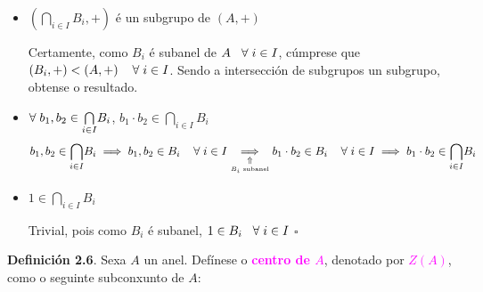 \documentclass[twoside]{report}
\newcommand{\magbf}[1]{\textcolor{magenta}{\textbf{#1}}} %
\newcommand{\magen}[1]{\textcolor{magenta}{#1}}
\theoremstyle{mystyle}
\begin{document}
\begin{itemize}
    
    \item $(\underset{i \in I}{\bigcap}B_{i}, +)$ é un subgrupo de $(A, +)$
    
    Certamente, como $B_{i}$ é subanel de $A \hspace{3mm} \forall \hspace{1mm} i \in I$, cúmprese que $(B_{i},+) < (A,+) \hspace{4mm} \forall \hspace{1mm} i \in I$. Sendo a intersección de subgrupos un subgrupo, obtense o resultado.
    
    \item $\forall \hspace{1mm} b_{1},b_{2} \in \underset{i \in I}{\bigcap}B_{i}$, $b_{1} \cdot b_{2} \in \underset{i \in I}{\bigcap}B_{i}$
    $$b_{1},b_{2} \in \underset{i \in I}{\bigcap}B_{i} \implies b_{1}, b_{2} \in B_{i} \hspace{4mm} \forall \hspace{1mm} i \in I \underset{\underset{B_{i} \text{ subanel}}{\Uparrow}}{\implies} b_{1} \cdot b_{2} \in B_{i} \hspace{4mm} \forall \hspace{1mm} i \in I \implies b_{1} \cdot b_{2} \in \underset{i \in I}{\bigcap}B_{i}$$
    
    \item $1 \in \underset{i \in I}{\bigcap}B_{i}$
    
    Trivial, pois como $B_{i}$ é subanel, $1 \in B_{i} \hspace{3mm} \forall \hspace{1mm} i \in I$ \hspace{3mm} $\square$
    
\end{itemize}

\vspace{3mm}

\noindent \textbf{Definición 2.6}. Sexa $A$ un anel. Defínese o \magbf{centro de $A$}, denotado por \magen{$Z(A)$}, como o seguinte subconxunto de $A$:
\begin{center}
\end{center}
\end{document}
